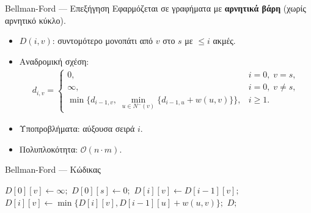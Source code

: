 \documentclass{beamer}
\makeatletter
\newenvironment{yellowalgo}{
    \begin{tcolorbox}[colback=myyellow, colframe=myyellow, boxrule=0.5pt]
    \begin{algorithmic}[1]
    \setcounter{ALG@line}{-1}
}{
    \end{algorithmic}
    \end{tcolorbox}
}
\makeatother
\begin{document}
\begin{frame}{Bellman-Ford --- Επεξήγηση}
Εφαρμόζεται σε γραφήματα με \textbf{αρνητικά βάρη} (χωρίς αρνητικό κύκλο).
\begin{itemize}
    \item $D(i, v)$: συντομότερο μονοπάτι από $v$ στο $s$ με $\leq i$ ακμές.
    \item Αναδρομική σχέση:
    \begin{align*}
        d_{i,v} =
        \begin{cases}
            0, & i=0,\; v=s, \\
            \infty, & i=0,\; v \neq s, \\
            \min\{d_{i-1,v},\;\min_{u\in N^-(v)}\{d_{i-1,u}+w(u,v)\}\}, & i\geq 1.
        \end{cases}
    \end{align*}
    \item Υποπροβλήματα: αύξουσα σειρά $i$.
    \item Πολυπλοκότητα: $\mathcal{O}(n \cdot m)$.
\end{itemize}
\end{frame}

\begin{frame}{Bellman-Ford --- Κώδικας}
\begin{yellowalgo}
            \State $D[0][v] \gets \infty;$
        \EndFor
        \State $D[0][s] \gets 0;$
                \State $D[i][v] \gets D[i - 1][v];$
                    \State $D[i][v] \gets \min\{D[i][v], D[i-1][u] + w(u,v)\};$
                \EndFor
            \EndFor
        \EndFor
        \State \Return $D;$
    \EndFunction
\end{yellowalgo}
\end{frame}
\end{document}
